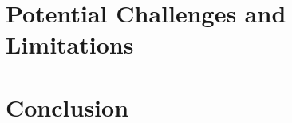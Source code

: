 \documentclass{article}
\begin{document}
\section{Potential Challenges and Limitations}

\section{Conclusion}


\printbibliography

\newpage
\appendix


\end{document}
